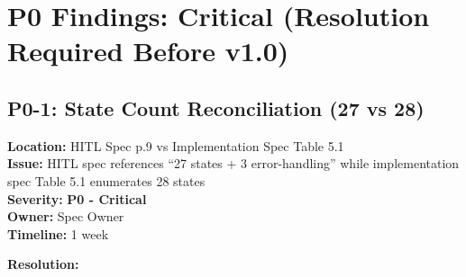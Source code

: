 \section{P0 Findings: Critical (Resolution Required Before v1.0)}
\label{sec:p0-findings}

\subsection{P0-1: State Count Reconciliation (27 vs 28)}
\label{sec:p0-state-count}

\begin{tcolorbox}[colback=red!5,colframe=red!70,title=\faIcon{exclamation-triangle} Finding P0-1: State Count Inconsistency]
\textbf{Location:} HITL Spec p.9 vs Implementation Spec Table 5.1\\
\textbf{Issue:} HITL spec references ``27 states + 3 error-handling'' while 
implementation spec Table 5.1 enumerates 28 states\\
\textbf{Severity:} \textbf{P0 - Critical}\\
\textbf{Owner:} Spec Owner\\
\textbf{Timeline:} 1 week
\end{tcolorbox}

\textbf{Resolution:}

